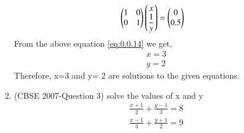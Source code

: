 \documentclass[journal,12pt,twocolumn]{IEEEtran}
\begin{document}
\begin{enumerate}
 \begin{align}
&\myvec{1&0\\0&1} \myvec{x\\\displaystyle\frac{1}{y}}= \myvec{0\\0.5}& \label{eq:0.0.14}
\medskip
\end{align}
From the above equation \eqref{eq:0.0.14} we get,
\begin{align}
&x=3&\\
&y=2&
\end{align}
Therefore, x=3 and y= 2 are solutions to the given equations.
\bigskip
\item (CBSE 2007-Question 3)
solve the values of x and y
\begin{align}
\displaystyle\frac{x+1}{2}+\displaystyle\frac{y-1}{3}=8\\
\displaystyle\frac{x-1}{3}+\displaystyle\frac{y+1}{2}=9\end{align}


\end{enumerate}
\end{document}

